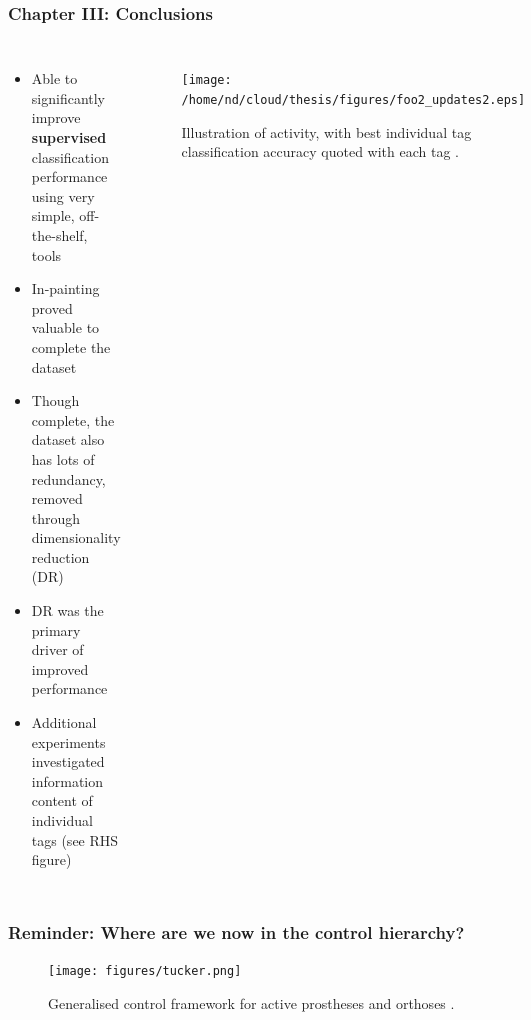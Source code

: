 \documentclass[aspectratio=169]{beamer}
\begin{document}

\begin{frame}[plain]
    \frametitle{Chapter III: Conclusions}
    \begin{columns}[t] 
        \begin{itemize}
            \item Able to significantly improve {\bf supervised} classification performance using very simple, off-the-shelf, tools 
            \item In-painting proved valuable to complete the dataset
            \item Though complete, the dataset also has lots of redundancy, removed through dimensionality reduction
                (DR)
            \item DR was the primary driver of improved performance
            \item Additional experiments investigated information content of individual tags (see RHS figure)
        \end{itemize}
        \begin{figure}
            \centering
            \texttt{[image: /home/nd/cloud/thesis/figures/foo2\_updates2.eps]}
            \caption{Illustration of activity, with best individual tag classification
            accuracy quoted with each tag \citep{dhir2014improved}.}
        \end{figure}
    \end{columns}
\end{frame}


\begin{frame}[plain]
    \frametitle{Reminder: Where are we now in the control hierarchy?}
    \begin{figure}
        \centering
        \texttt{[image: figures/tucker.png]}
        \caption{Generalised control framework for active prostheses and orthoses \citep{tucker2015control}.}
    \end{figure}
\end{frame}

\end{document}
